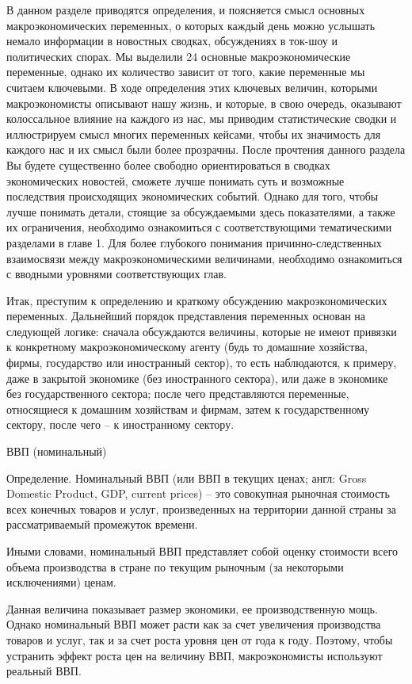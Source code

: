 \documentclass[12pt,a4paper]{article}
\begin{document}
В данном разделе приводятся определения, и поясняется смысл основных макроэкономических переменных, о которых каждый день можно услышать немало информации в новостных сводках, обсуждениях в ток-шоу и политических спорах. Мы выделили 24 основные макроэкономические переменные, однако их количество зависит от того, какие переменные мы считаем ключевыми. В ходе определения этих ключевых величин, которыми макроэкономисты описывают нашу жизнь, и которые, в свою очередь, оказывают колоссальное влияние на каждого из нас, мы приводим статистические сводки и иллюстрируем смысл многих переменных кейсами, чтобы их значимость для каждого нас и их смысл были более прозрачны. 
После прочтения данного раздела Вы будете существенно более свободно ориентироваться в сводках экономических новостей, сможете лучше понимать суть и возможные последствия происходящих экономических событий. Однако для того, чтобы лучше понимать детали, стоящие за обсуждаемыми здесь показателями, а также их ограничения, необходимо ознакомиться с соответствующими тематическими разделами в главе 1. Для более глубокого понимания причинно-следственных взаимосвязи между макроэкономическими величинами, необходимо ознакомиться с вводными уровнями соответствующих глав.

Итак, преступим к определению и краткому обсуждению макроэкономических переменных. Дальнейший порядок представления переменных основан на следующей логике: сначала обсуждаются величины, которые не имеют привязки к конкретному макроэкономическому агенту (будь то домашние хозяйства, фирмы, государство или иностранный сектор), то есть наблюдаются, к примеру, даже в закрытой экономике (без иностранного сектора), или даже в экономике без государственного сектора; после чего представляются переменные, относящиеся к домашним хозяйствам и фирмам, затем к государственному сектору, после чего – к иностранному сектору.

	ВВП (номинальный) 

Определение. Номинальный ВВП (или ВВП в текущих ценах; англ: Gross Domestic Product, GDP, current prices) – это совокупная рыночная стоимость всех конечных товаров и услуг, произведенных на территории данной страны за рассматриваемый промежуток времени.

Иными словами, номинальный ВВП представляет собой оценку стоимости всего объема производства в стране по текущим рыночным (за некоторыми исключениями) ценам.

Данная величина показывает размер экономики, ее производственную мощь. Однако номинальный ВВП может расти как за счет увеличения производства товаров и услуг, так и за счет роста уровня цен от года к году. Поэтому, чтобы устранить эффект роста цен на величину ВВП, макроэкономисты используют реальный ВВП.
\end{document}
